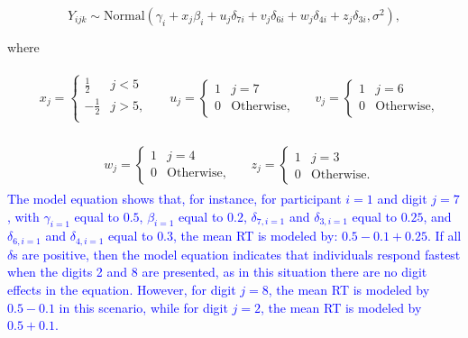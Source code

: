 \documentclass[
  english,
  doc,floatsintext]{apa6}
\begin{document}
\begin{equation}
Y_{ijk} \sim \text{Normal}(\gamma_{i} + x_j \beta_{i} + u_j \delta_{7i} + v_j \delta_{6 i} + w_j \delta_{4i} + z_j \delta_{3i}, \sigma^2), \label{eq:datalevel}
\end{equation}

where

\begin{align*}
&
\begin{aligned}
x_j = 
\begin{cases}
\frac{1}{2} & j < 5\\
- \frac{1}{2} & j > 5, \\
\end{cases}
\end{aligned}
&
\begin{aligned}
u_j = 
\begin{cases}
1 & j = 7\\
0 & \text{Otherwise},
\end{cases}
\end{aligned}
&
\begin{aligned}
v_j = 
\begin{cases}
1 & j = 6\\
0 & \text{Otherwise},
\end{cases}
\end{aligned}
\end{align*}

\begin{align*}
&
\begin{aligned}
w_j = 
\begin{cases}
1 & j = 4\\
0 & \text{Otherwise},
\end{cases}
\end{aligned}
&
\begin{aligned}
z_j = 
\begin{cases}
1 & j = 3\\
0 & \text{Otherwise}.
\end{cases}
\end{aligned}
\end{align*}
\textcolor{blue}{The model equation shows that, for instance, for participant $i = 1$ and digit $j = 7$, with $\gamma_{i = 1}$ equal to $0.5$, $\beta_{i = 1}$ equal to $0.2$, $\delta_{7, i = 1}$ and $\delta_{3, i = 1}$ equal to $0.25$, and $\delta_{6, i = 1}$ and $\delta_{4, i = 1}$ equal to $0.3$, the mean RT is modeled by: $0.5 - 0.1 +  0.25$. If all $\delta$s are positive, then the model equation indicates that individuals respond fastest when the digits 2 and 8 are presented, as in this situation there are no digit effects in the equation. However, for digit $j = 8$, the mean RT is modeled by $0.5 - 0.1$ in this scenario, while for digit $j = 2$, the mean RT is modeled by $0.5 + 0.1$.}
\end{document}
